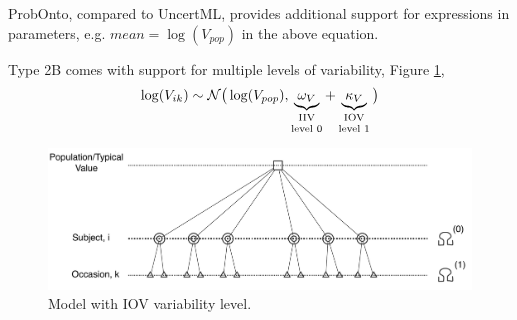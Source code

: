 \begin{note}   ProbOnto, compared to UncertML, provides additional support for 
expressions in parameters, e.g. $mean = \log(V_{pop})$ in the above equation.
\end{note}

\begin{note} Type 2B comes with support for multiple levels of variability, Figure \ref{fig:IOVtree},
\begin{align*}
\log(V_{ik}) \sim \mathcal N\big(\log(V_{pop}), \underbrace{\omega_V}_{\text{\parbox{.8cm}{\centering IIV\\[-4pt] level 0}}} +  \underbrace{\kappa_V}_{\text{\parbox{.8cm}{\centering IOV\\[-4pt] level 1}}}\big)
\end{align*}
\end{note}

\begin{figure}[htb!]
\centering
 \includegraphics[width=120mm]{pics/IOV_2levels}
\caption{Model with IOV variability level.}
\vspace{-1em}
\label{fig:IOVtree}
\end{figure}

